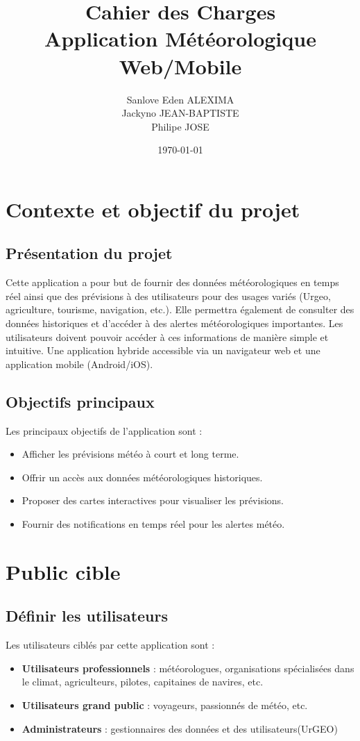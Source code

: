 \documentclass[a4paper,12pt]{article}
\title{Cahier des Charges\\Application Météorologique Web/Mobile}
\author{Sanlove Eden ALEXIMA\\Jackyno JEAN-BAPTISTE\\{Philipe JOSE}\\}
\date{\today}
\begin{document}
\maketitle

\tableofcontents
\newpage

\section{Contexte et objectif du projet}
\subsection{Présentation du projet}
Cette application a pour but de fournir des données météorologiques en temps réel ainsi que des prévisions à des utilisateurs pour des usages variés (Urgeo, agriculture, tourisme, navigation, etc.). 
Elle permettra également de consulter des données historiques et d'accéder à des alertes météorologiques importantes. Les utilisateurs doivent pouvoir accéder à ces informations de manière simple et intuitive. Une application hybride accessible via un navigateur web et une application mobile (Android/iOS).

\subsection{Objectifs principaux}
Les principaux objectifs de l'application sont :
\begin{itemize}
    \item Afficher les prévisions météo à court et long terme.
    \item Offrir un accès aux données météorologiques historiques.
    \item Proposer des cartes interactives pour visualiser les prévisions.
    \item Fournir des notifications en temps réel pour les alertes météo.
\end{itemize}

\section{Public cible}
\subsection{Définir les utilisateurs}
Les utilisateurs ciblés par cette application sont :
\begin{itemize}
    \item \textbf{Utilisateurs professionnels} : météorologues, organisations spécialisées dans le climat, agriculteurs, pilotes, capitaines de navires, etc.
    \item \textbf{Utilisateurs grand public} : voyageurs, passionnés de météo, etc.
    \item \textbf{Administrateurs} : gestionnaires des données et des utilisateurs(UrGEO)
\end{itemize}
\end{document}
